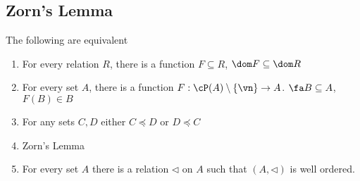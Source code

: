 
\subsection{Zorn's Lemma}

\begin{theorem}
    The following are equivalent 
    \begin{enumerate}
        \item For every relation $R$, there is a function $F \subseteq R$, $\dom F \subseteq \dom R$
        \setcounter{enumi}{2}
        \item For every set $A$, there is a function $F: \cP(A) \setminus \{\vn\} \to A$. $\fa B \subseteq A$, $F(B) \in B$ 
        \setcounter{enumi}{4}
        \item For any sets $C,D$ either $C \preceq D$ or $D \preceq C$ 
        \item Zorn's Lemma
        \item For every set $A$ there is a relation $\triangleleft$ on $A$ such that $(A, \triangleleft)$ is well ordered. 
    \end{enumerate}
\end{theorem}

